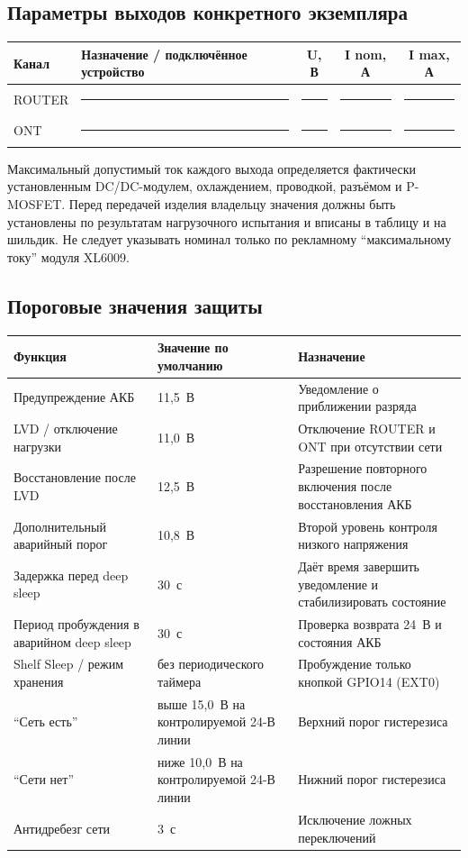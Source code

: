 \documentclass[11pt,a4paper]{article}
\begin{document}
\subsection{Параметры выходов конкретного экземпляра}
\begin{tabularx}{\textwidth}{@{}lXccc@{}}
\toprule
\textbf{Канал} & \textbf{Назначение / подключённое устройство} & \textbf{U, В} & \textbf{I nom, А} & \textbf{I max, А} \\
\midrule
ROUTER & \rule{45mm}{0.4pt} & \rule{12mm}{0.4pt} & \rule{12mm}{0.4pt} & \rule{12mm}{0.4pt} \\
ONT & \rule{45mm}{0.4pt} & \rule{12mm}{0.4pt} & \rule{12mm}{0.4pt} & \rule{12mm}{0.4pt} \\
\bottomrule
\end{tabularx}

\begin{tcolorbox}[colback=lightaccent,colframe=accent,title=Примечание по выходным токам]
Максимальный допустимый ток каждого выхода определяется фактически установленным DC/DC-модулем, охлаждением, проводкой, разъёмом и P-MOSFET. Перед передачей изделия владельцу значения должны быть установлены по результатам нагрузочного испытания и вписаны в таблицу и на шильдик. Не следует указывать номинал только по рекламному ``максимальному току'' модуля XL6009.
\end{tcolorbox}

\subsection{Пороговые значения защиты}
\begin{tabularx}{\textwidth}{@{}XlX@{}}
\toprule
\textbf{Функция} & \textbf{Значение по умолчанию} & \textbf{Назначение} \\
\midrule
Предупреждение АКБ & 11,5~В & Уведомление о приближении разряда \\
LVD / отключение нагрузки & 11,0~В & Отключение ROUTER и ONT при отсутствии сети \\
Восстановление после LVD & 12,5~В & Разрешение повторного включения после восстановления АКБ \\
Дополнительный аварийный порог & 10,8~В & Второй уровень контроля низкого напряжения \\
Задержка перед deep sleep & 30~с & Даёт время завершить уведомление и стабилизировать состояние \\
Период пробуждения в аварийном deep sleep & 30~с & Проверка возврата 24~В и состояния АКБ \\
Shelf Sleep / режим хранения & без периодического таймера & Пробуждение только кнопкой GPIO14 (EXT0) \\
``Сеть есть'' & выше 15,0~В на контролируемой 24-В линии & Верхний порог гистерезиса \\
``Сети нет'' & ниже 10,0~В на контролируемой 24-В линии & Нижний порог гистерезиса \\
Антидребезг сети & 3~с & Исключение ложных переключений \\
\bottomrule
\end{tabularx}
\end{document}

